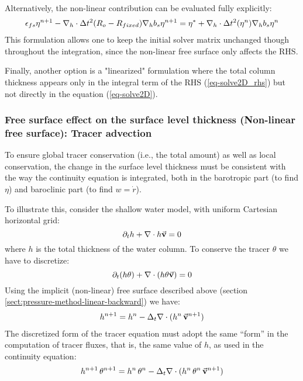 Alternatively, the non-linear contribution can be evaluated fully
explicitly:
\begin{eqnarray*}
\epsilon_{fs} {\eta}^{n+1} -
{\bf \nabla}_h \cdot \Delta t^2 (R_o-R_{fixed})
{\bf \nabla}_h b_s {\eta}^{n+1}
= {\eta}^*
+{\bf \nabla}_h \cdot \Delta t^2 (\eta^{n})
{\bf \nabla}_h b_s {\eta}^{n}
\end{eqnarray*} 
This formulation allows one to keep the initial solver matrix
unchanged though throughout the integration, since the non-linear free
surface only affects the RHS.

Finally, another option is a "linearized" formulation where the total
column thickness appears only in the integral term of the RHS
(\ref{eq-solve2D_rhs}) but not directly in the equation
(\ref{eq-solve2D}).


\subsubsection{Free surface effect on the surface level thickness
(Non-linear free surface): Tracer advection}
\label{sect:freesurf-tracer-advection}

To ensure global tracer conservation (i.e., the total amount) as well
as local conservation, the change in the surface level thickness must
be consistent with the way the continuity equation is integrated, both
in the barotropic part (to find $\eta$) and baroclinic part (to find
$w = \dot{r}$).

To illustrate this, consider the shallow water model, with uniform
Cartesian horizontal grid:
$$
\partial_t h + \nabla \cdot h \vec{\bf v} = 0
$$
where $h$ is the total thickness of the water column.
To conserve the tracer $\theta$ we have to discretize:
$$
\partial_t (h \theta) + \nabla \cdot ( h \theta \vec{\bf v})= 0
$$
Using the implicit (non-linear) free surface described above (section
\ref{sect:pressure-method-linear-backward}) we have:
\begin{eqnarray*}
h^{n+1} = h^{n} - \Delta_t \nabla \cdot (h^n \, \vec{\bf v}^{n+1} ) \\
\end{eqnarray*}
The discretized form of the tracer equation must adopt the same
``form'' in the computation of tracer fluxes, that is, the same value
of $h$, as used in the continuity equation:
\begin{eqnarray*}
h^{n+1} \, \theta^{n+1} = h^n \, \theta^n 
        - \Delta_t \nabla \cdot (h^n \, \theta^n \, \vec{\bf v}^{n+1})
\end{eqnarray*}

